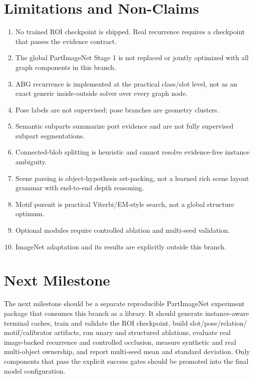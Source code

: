 \documentclass[11pt]{article}
\begin{document}
\section{Limitations and Non-Claims}

\begin{enumerate}[leftmargin=*]
  \item No trained ROI checkpoint is shipped. Real recurrence requires a checkpoint
  that passes the evidence contract.
  \item The global PartImageNet Stage 1 is not replaced or jointly optimized with
  all graph components in this branch.
  \item ABG recurrence is implemented at the practical class/slot level, not as an
  exact generic inside-outside solver over every graph node.
  \item Pose labels are not supervised; pose branches are geometry clusters.
  \item Semantic subparts summarize port evidence and are not fully supervised
  subpart segmentations.
  \item Connected-blob splitting is heuristic and cannot resolve evidence-free
  instance ambiguity.
  \item Scene parsing is object-hypothesis set-packing, not a learned rich scene
  layout grammar with end-to-end depth reasoning.
  \item Motif pursuit is practical Viterbi/EM-style search, not a global structure
  optimum.
  \item Optional modules require controlled ablation and multi-seed validation.
  \item ImageNet adaptation and its results are explicitly outside this branch.
\end{enumerate}

\section{Next Milestone}

The next milestone should be a separate reproducible PartImageNet experiment
package that consumes this branch as a library. It should generate instance-aware
terminal caches, train and validate the ROI checkpoint, build slot/pose/relation/
motif/calibrator artifacts, run unary and structured ablations, evaluate real
image-backed recurrence and controlled occlusion, measure synthetic and real
multi-object ownership, and report multi-seed mean and standard deviation. Only
components that pass the explicit success gates should be promoted into the final
model configuration.
\end{document}
